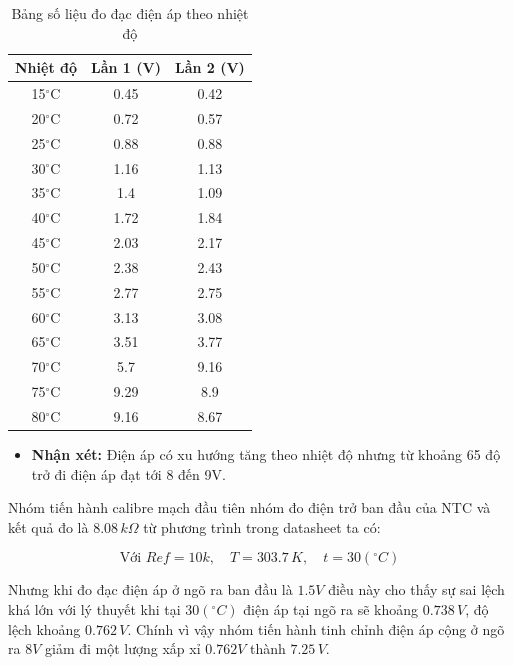 \begin{table}[H]
	\centering
	\caption{Bảng số liệu đo đạc điện áp theo nhiệt độ}
	\vspace{0.2cm}
	\begin{tabular}{|c|c|c|}
		\hline
		\textbf{Nhiệt độ} & \textbf{Lần 1 (V)} & \textbf{Lần 2 (V)} \\
		\hline
		15$^\circ$C & 0.45 & 0.42 \\
		\hline
		20$^\circ$C & 0.72 & 0.57 \\
		\hline
		25$^\circ$C & 0.88 & 0.88 \\
		\hline
		30$^\circ$C & 1.16 & 1.13 \\
		\hline
		35$^\circ$C & 1.4 & 1.09 \\
		\hline
		40$^\circ$C & 1.72 & 1.84 \\
		\hline
		45$^\circ$C & 2.03 & 2.17 \\
		\hline
		50$^\circ$C & 2.38 & 2.43 \\
		\hline
		55$^\circ$C & 2.77 & 2.75 \\
		\hline
		60$^\circ$C & 3.13 & 3.08 \\
		\hline
		65$^\circ$C & 3.51 & 3.77 \\
		\hline
		70$^\circ$C & 5.7 & 9.16 \\
		\hline
		75$^\circ$C & 9.29 & 8.9 \\
		\hline
		80$^\circ$C & 9.16 & 8.67 \\
		\hline
	\end{tabular}
\end{table}

\begin{itemize}
	\item \textbf{Nhận xét:} Điện áp có xu hướng tăng theo nhiệt độ nhưng từ khoảng 65 độ trở đi điện áp đạt tới 8 đến 9V.
\end{itemize}

Nhóm tiến hành calibre mạch đầu tiên nhóm đo điện trở ban đầu của NTC và kết quả đo là $8.08 \, k\Omega$ từ phương trình trong datasheet ta có:

\[
\text{Với } Ref = 10k, \quad T = 303.7 \, K, \quad t = 30 (^\circ C)
\]

Nhưng khi đo đạc điện áp ở ngõ ra ban đầu là $1.5V$ điều này cho thấy sự sai lệch khá lớn với lý thuyết khi tại $30 (^\circ C)$ điện áp tại ngõ ra sẽ khoảng $0.738 \, V$, độ lệch khoảng $0.762 \, V$. Chính vì vậy nhóm tiến hành tinh chỉnh điện áp cộng ở ngõ ra $8V$ giảm đi một lượng xấp xỉ $0.762V$ thành $7.25 \, V$.

